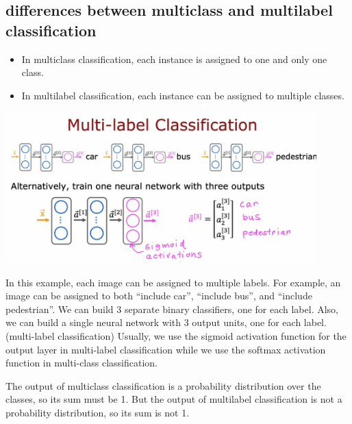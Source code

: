 \subsection*{differences between multiclass and multilabel classification}
\begin{itemize}
    \item In multiclass classification, each instance is assigned to one and only one class.
    \item In multilabel classification, each instance can be assigned to multiple classes.
\end{itemize}
\noindent
\includegraphics*[width=0.9\textwidth]{images/9.1}\par
In this example, each image can be assigned to multiple labels.
For example, an image can be assigned to both ``include car'', ``include bus'', and ``include pedestrian''.
We can build 3 separate binary classifiers, one for each label.
Also, we can build a single neural network with 3 output units, one for each label. (multi-label classification)
Usually, we use the sigmoid activation function for the output layer in multi-label classification 
while we use the softmax activation function in multi-class classification.
\begin{notebox}
    The output of multiclass classification is a probability distribution over the classes, so its sum must be 1.
    But the output of multilabel classification is not a probability distribution, so its sum is not 1.
\end{notebox}

